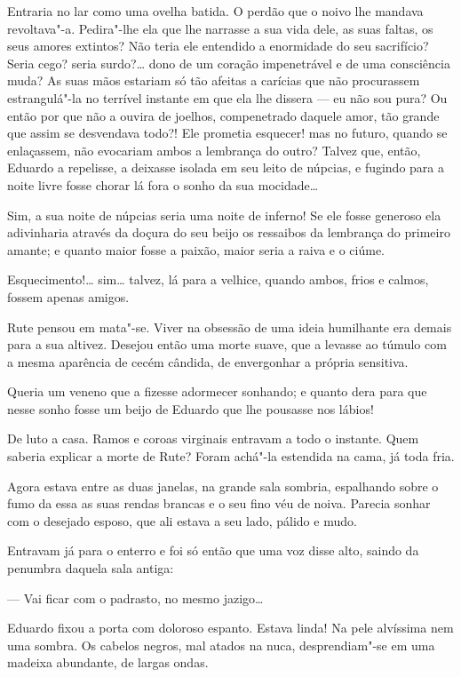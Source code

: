 Entraria no lar como uma ovelha batida. O perdão que o noivo lhe mandava
revoltava"-a. Pedira"-lhe ela que lhe narrasse a sua vida dele, as suas
faltas, os seus amores extintos? Não teria ele entendido a enormidade do
seu sacrifício? Seria cego? seria surdo?\ldots{} dono de um coração
impenetrável e de uma consciência muda? As suas mãos estariam só tão
afeitas a carícias que não procurassem estrangulá"-la no terrível
instante em que ela lhe dissera --- eu não sou pura? Ou então por que
não a ouvira de joelhos, compenetrado daquele amor, tão grande que assim
se desvendava todo?! Ele prometia esquecer! mas no futuro, quando se
enlaçassem, não evocariam ambos a lembrança do outro? Talvez que, então,
Eduardo a repelisse, a deixasse isolada em seu leito de núpcias, e
fugindo para a noite livre fosse chorar lá fora o sonho da sua
mocidade\ldots{}

Sim, a sua noite de núpcias seria uma noite de inferno! Se ele fosse
generoso ela adivinharia através da doçura do seu beijo os ressaibos da
lembrança do primeiro amante; e quanto maior fosse a paixão, maior seria
a raiva e o ciúme.

Esquecimento!\ldots{} sim\ldots{} talvez, lá para a velhice, quando ambos, frios e
calmos, fossem apenas amigos.

Rute pensou em mata"-se. Viver na obsessão de uma ideia humilhante era
demais para a sua altivez. Desejou então uma morte suave, que a levasse
ao túmulo com a mesma aparência de cecém cândida, de envergonhar a
própria sensitiva.

Queria um veneno que a fizesse adormecer sonhando; e quanto dera para
que nesse sonho fosse um beijo de Eduardo que lhe pousasse nos lábios!

\asterisc

De luto a casa. Ramos e coroas virginais entravam a todo o instante.
Quem saberia explicar a morte de Rute? Foram achá"-la estendida na cama,
já toda fria.

Agora estava entre as duas janelas, na grande sala sombria, espalhando
sobre o fumo da essa as suas rendas brancas e o seu fino véu de noiva.
Parecia sonhar com o desejado esposo, que ali estava a seu lado, pálido
e mudo.

Entravam já para o enterro e foi só então que uma voz disse alto, saindo
da penumbra daquela sala antiga:

--- Vai ficar com o padrasto, no mesmo jazigo\ldots{}

Eduardo fixou a porta com doloroso espanto. Estava linda! Na pele
alvíssima nem uma sombra. Os cabelos negros, mal atados na nuca,
desprendiam"-se em uma madeixa abundante, de largas ondas.

